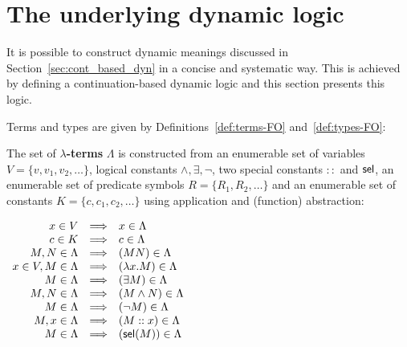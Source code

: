 \section{The underlying dynamic logic} \label{sec:dyn_log}

It is possible to construct dynamic meanings discussed in Section~\ref{sec:cont_based_dyn} in a concise and systematic way. This is achieved by defining a continuation-based dynamic logic and this section presents this logic.

Terms and types are given by Definitions~\ref{def:terms-FO} and~\ref{def:types-FO}:
\begin{definition}\label{def:FO-lambda-terms}
 The set of \textbf{$\lambda$-terms} $\Lambda$ is constructed from an enumerable set of variables $V = \{ v, v_1, v_2, \dots \}$, logical constants $\land, \exists, \neg$, two special constants $::$ and $\mathsf{sel}$, an enumerable set of predicate symbols $R = \{ R_1, R_2, \dots  \}$ and an enumerable set of constants $K = \{ c, c_1, c_2, \dots \}$  using application and (function) abstraction:
\begin{center}
$
\begin{array}{rcl}
x \in V & \Longrightarrow & x \in \Lambda\\
c \in K & \Longrightarrow & c \in \Lambda\\
M,N \in \Lambda &  \Longrightarrow & (MN) \in \Lambda\\ 
 x \in V, M \in \Lambda&  \Longrightarrow  & (\lambda x.M) \in \Lambda \\
  M \in \Lambda&  \Longrightarrow  & (\exists M) \in \Lambda\\ 
M,N \in \Lambda &  \Longrightarrow  & (M \land N) \in \Lambda \\
M \in \Lambda &  \Longrightarrow  & (\neg M)  \in \Lambda \\
M,x \in \Lambda &  \Longrightarrow  & (M::x) \in \Lambda\\
M \in \Lambda &  \Longrightarrow  & (\mathsf{sel}(M))  \in \Lambda
\end{array} 
$
\end{center}
\label{def:terms-FO}
\end{definition}



